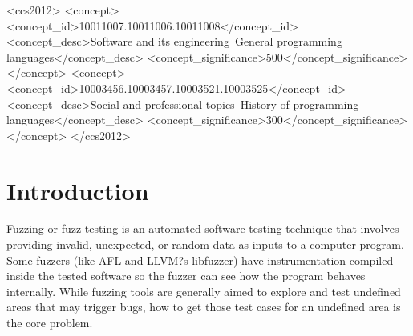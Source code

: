 \documentclass[sigplan,10pt,review]{acmart}\settopmatter{printfolios=true,printccs=false,printacmref=false}
\begin{document}
\begin{CCSXML}
<ccs2012>
<concept>
<concept_id>10011007.10011006.10011008</concept_id>
<concept_desc>Software and its engineering~General programming languages</concept_desc>
<concept_significance>500</concept_significance>
</concept>
<concept>
<concept_id>10003456.10003457.10003521.10003525</concept_id>
<concept_desc>Social and professional topics~History of programming languages</concept_desc>
<concept_significance>300</concept_significance>
</concept>
</ccs2012>
\end{CCSXML}





\maketitle


\section{Introduction}

Fuzzing or fuzz testing is an automated software testing technique that involves providing invalid, unexpected, or random data as inputs to a computer program. Some fuzzers (like AFL and LLVM?s libfuzzer) have instrumentation compiled inside the tested software so the fuzzer can see how the program behaves internally. While fuzzing tools are generally aimed to explore and test undefined areas that may trigger bugs, how to get those test cases   for   an   undefined   area   is   the   core   problem.
\end{document}

